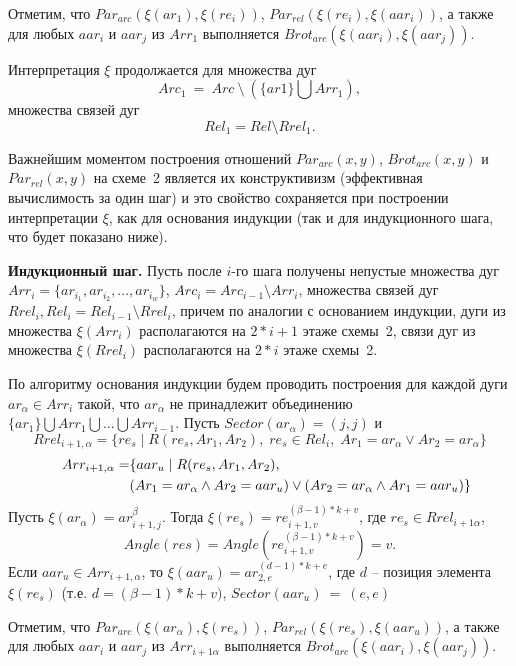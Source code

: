 Отметим, что $Par_{arc}(\xi (ar_1), \xi (re_i))$, $Par_{rel}(\xi (re_i), \xi 
(aar_i))$, а также для любых $aar_i$ и $aar_j$ из $Arr_1$ выполняется 
$Brot_{arc}(\xi 
(aar_i), \xi (aar_j))$.

Интерпретация $\xi$ продолжается для множества дуг 
$$Arc_1~=~Arc~\setminus~(\{ ar1\} \bigcup Arr_1),
$$ множества связей дуг $$Rel_1 = Rel \setminus Rrel_1.$$

\begin{remark}
Важнейшим моментом построения отношений 
$Par_{arc}( x, y)$, $Brot_{arc}(x,y)$ и $Par_{rel}( x, y)$
на схеме~2 является их конструктивизм (эффективная вычислимость за один шаг) и 
это свойство сохраняется при построении интерпретации $\xi$, как для основания 
индукции (так и для индукционного шага, что будет показано ниже). 
\end{remark}

\textbf{Индукционный шаг.} Пусть после $i$-го шага получены непустые множества дуг $Arr_i = \{ ar_{i_1}, ar_{i_2}, ..., ar_{i_w} \} $, $Arc_i = Arc_{i-1} \setminus Arr_i$, множества связей дуг $Rrel_i , Rel_i = Rel_{i-1} \setminus Rrel_i$, причем по аналогии с основанием индукции, дуги из множества 
$\xi(Arr_i)$ располагаются на $2 * i + 1$ этаже схемы~2, связи дуг из множества $\xi(Rrel_i)$ располагаются на $2 * i$ этаже схемы~2.

По алгоритму основания индукции будем проводить построения для каждой дуги $ar_\alpha \in Arr_i$ такой, что $ar_\alpha$ не принадлежит объединению $\{ar_1 \} \bigcup Arr_1 \bigcup ... \bigcup Arr_{i-1}$.
Пусть $Sector(ar_\alpha) = (j, j)$ и 
$$Rrel_{i+1,\alpha} = \{ re_s\;|\;R(re_s, Ar_1 , Ar_2),\;re_s \in Rel_i,\;Ar_1 = ar_\alpha \vee Ar_2 = ar_\alpha \}$$
\begin{equation*}
\begin{split}
\shoveleft Arr_{i+1,\alpha} = &\{aar_u\;|\;R(re_s, Ar_1 , Ar_2), \\
&(Ar_1 = ar_\alpha \wedge Ar_2 = aar_u) \vee (Ar_2 = ar_\alpha \wedge Ar_1 = aar_u)\}
\end{split}
\end{equation*}
Пусть $\xi(ar_\alpha) = ar_{i+1,j}^\beta$.
Тогда $\xi(re_s) =re_{i+1,v}^{(\beta-1)*k+v}$, где $re_s \in Rrel_{i+1\alpha}$, 
$$Angle(res) = Angle(re_{i+1, v}^{(\beta-1)*k+v}) = v.$$
Если $aar_u \in Arr_{i+1,\alpha}$, то $\xi(aar_u) = ar_{2,e}^{(d-1)*k+e}$, где $d$ – позиция элемента~$\xi(re_s)$ (т.е. $d =(\beta-1)*k+v)$, $Sector(aar_u)~=~(e, e)$

Отметим, что $Par_{arc}(\xi(ar_\alpha), \xi(re_s))$, 
$Par_{rel}(\xi(re_s),\xi(aar_u))$, а также для любых $aar_i$ и $aar_j$ из 
$Arr_{i+1\alpha}$ выполняется $Brot_{arc}(\xi(aar_i), \xi(aar_j))$.

